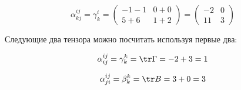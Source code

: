 \documentclass[12pt, a4paper]{article}
\begin{document}
    \begin{equation}
        \alpha^{ij}_{kj} = \gamma^{i}_{k} = \begin{pmatrix}
            -1 - 1 & 0 + 0 \\
            5 + 6 & 1 + 2
        \end{pmatrix} = \begin{pmatrix}
            -2 & 0 \\
            11 & 3
        \end{pmatrix}
    \end{equation}

    Следующие два тензора можно посчитать используя первые два:

    \begin{equation}
        \alpha^{ij}_{ij} = \gamma^{k}_{k} = \tr \Gamma = -2 + 3 = 1
    \end{equation}

    \begin{equation}
        \alpha^{ij}_{ji} = \beta^{k}_{k} = \tr B = 3 + 0 = 3
    \end{equation}
    
\end{document}
